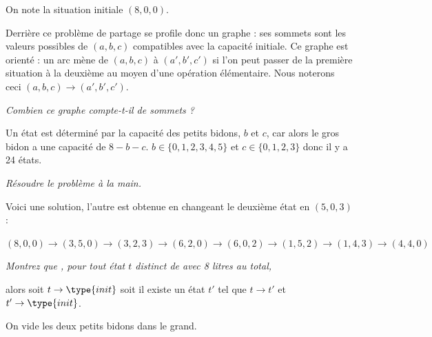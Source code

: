 On note  la situation initiale $(8, 0, 0)$.

\medskip

Derrière ce problème de partage se profile donc un graphe : ses sommets sont les valeurs possibles de
$(a, b, c)$ compatibles avec la capacité initiale. Ce graphe est orienté : un arc mène de $(a, b, c)$ à $(a', b', c')$ si l'on peut passer de la première situation à la deuxième au moyen d'une opération élémentaire. Nous noterons ceci $(a, b, c) \rightarrow (a', b', c')$.
\newpage
\begin{Exercise}
{\it Combien ce graphe compte-t-il de sommets ?}
\end{Exercise}
\begin{Answer}

Un état est déterminé par la capacité des petits bidons, $b$ et $c$, car alors le gros bidon a une capacité de $8 - b - c$. $b\in \{0,1,2,3,4,5\}$ et $c\in \{0,1,2,3\}$ donc il y a 24 états.
\end{Answer}
\begin{Exercise}
{\it Résoudre le problème à la main.}
\end{Exercise}
\begin{Answer}

Voici une solution, l'autre est obtenue en changeant le deuxième état en $(5, 0, 3)$ :

$(8,0,0) \rightarrow (3,5,0) \rightarrow (3,2,3) \rightarrow (6,2,0) \rightarrow (6,0,2) \rightarrow (1,5,2) \rightarrow (1,4,3) \rightarrow (4,4,0)$
\end{Answer}
\begin{Exercise}
{\it Montrez que , pour tout état $t$ distinct de  avec 8 litres au total, 

alors soit $t \rightarrow  \type{init}$ 
soit il existe un état $t'$ tel que $t \rightarrow t'$ et $t' \rightarrow \type{init}$.}
\end{Exercise}
\begin{Answer}
On vide les deux petits bidons dans le grand.
\end{Answer}
